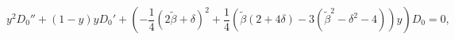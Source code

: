 \begin{equation}
y^2 D_0 ''+(1-y)yD_0'+\left(-\frac{1}{4}(2\tilde{\beta}+\delta)^
2+
\frac{1}{4}\left(\tilde{\beta}(2+4\delta)-3(\tilde{\beta}^2-
\delta^2-4) \right)y\right)D_0=0,
\end{equation}

